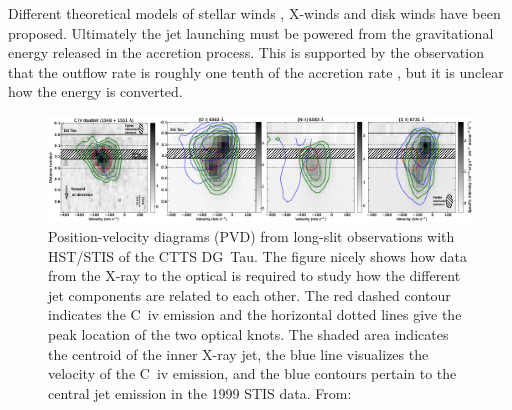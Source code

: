 \documentclass[12pt]{article}
\begin{document}
Different theoretical models of stellar winds \citep{1988ApJ...332L..41K,2005ApJ...632L.135M}, X-winds \citep{1994ApJ...429..781S} and disk winds \citep{1982MNRAS.199..883B,2005ApJ...630..945A} have been proposed. Ultimately the jet launching must be powered from the gravitational energy released in the accretion process. This is supported by the observation that the outflow rate is roughly one tenth of the accretion rate \citep{1990ApJ...354..687C,2008ApJ...689.1112C}, but it is unclear how the energy is converted.

\begin{figure}[htb]
\centering
\includegraphics[width=\textwidth]{aa18592-11-fig2.png}
\caption{Position-velocity diagrams (PVD) from long-slit observations with HST/STIS of the CTTS DG~Tau. The figure nicely shows how data from the X-ray to the optical is required to study how the different jet components are related to each other. The red dashed contour indicates the C~{\sc iv} emission and the horizontal dotted lines give the peak location of the two optical knots. The shaded area indicates the centroid of the inner X-ray jet, the blue line visualizes the velocity of the C~{\sc iv} emission, and the blue contours pertain to the central jet emission in the 1999 STIS data. From:}
\label{fig:CIV}
\end{figure}
\end{document}
